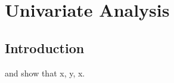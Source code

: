 
\chapter{Univariate Analysis} %

\label{Chapter1} %


\section{Introduction}
\cite{10.1109/64.21887} and \cite{frankel2014effects} show that x, y, x.
\lipsum
